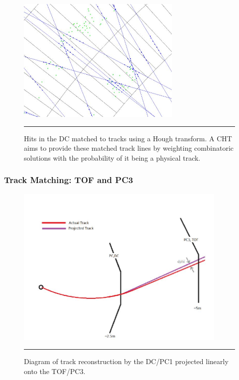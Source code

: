 \begin{figure}[htbp!]
  \centering
    \includegraphics[width=0.7\textwidth]{Figures/houghtransformcartoon.JPG}
    \rule{35em}{0.5pt}
  \caption[Hits in the DC matched to tracks using a Hough transform]{Hits in the DC matched to tracks using a Hough transform. A CHT aims to provide these matched track lines by weighting combinatoric solutions with the probability of it being a physical track.}
  \label{fig:houghtransform}
\end{figure}

\subsubsection{Track Matching: TOF and PC3}

\begin{figure}[H]
  \centering
    \includegraphics[width=0.9\textwidth]{Figures/pc3tofmatching.JPG}
    \rule{35em}{0.5pt}
  \caption[Diagram of track reconstruction by the DC/PC1 projected linearly onto the TOF/PC3]{Diagram of track reconstruction by the DC/PC1 projected linearly onto the TOF/PC3. \citep{schaeferthesis}}
  \label{fig:pc3tofmatching}
\end{figure}

